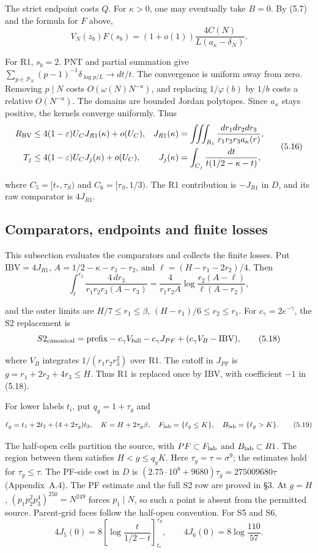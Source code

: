 The strict endpoint costs $Q$.
For $\kappa>0$, one may eventually take $B=0$.
By (5.7) and the formula for $F$ above,
\[
 V_N(z_b)F(s_b)=(1+o(1))\frac{4C(N)}{L(a_\kappa-\delta_N)}.
\tag{5.15}
\]

For R1, $s_b=2$.
PNT and partial summation give
$\sum_{p\in\mathcal P_N}(p-1)^{-1}\delta_{\log p/L}\to dt/t$.
The convergence is uniform away from zero.
Removing $p\mid N$ costs $O(\omega(N)N^{-u})$,
and replacing $1/\varphi(b)$ by $1/b$ costs a relative $O(N^{-u})$.
The domains are bounded Jordan polytopes.
Since $a_\kappa$ stays positive, the kernels converge uniformly.
Thus
\[
 \begin{aligned}
 R_{\rm BV}&\le4(1-\varepsilon)U_C J_{R1}(\kappa)+o(U_C),&
 J_{R1}(\kappa)&=\iiint_{R_1}\frac{dr_1dr_2dr_3}{r_1r_2r_3a_\kappa(r)},\\
 T_j&\le4(1-\varepsilon)U_C J_j(\kappa)+o(U_C),&
 J_j(\kappa)&=\int_{C_j}\frac{dt}{t(1/2-\kappa-t)},
 \end{aligned}
\tag{5.16}
\]

where $C_5=[t_*,\tau_S)$ and $C_6=[\tau_S,1/3)$.
The R1 contribution is $-J_{R1}$ in $D$,
and its raw comparator is $4J_{R1}$.

\subsection{Comparators, endpoints and finite losses}

This subsection evaluates the comparators and collects the finite losses.
Put $\mathrm{IBV}=4J_{R1}$,
$A=1/2-\kappa-r_1-r_2$, and $\ell=(H-r_1-2r_2)/4$.
Then
\[
 \int_\ell^{r_2}\frac{4\,dr_3}{r_1r_2r_3(A-r_3)}
 =\frac4{r_1r_2A}\log\frac{r_2(A-\ell)}{\ell(A-r_2)},
\tag{5.17}
\]

and the outer limits are $H/7\le r_1\le\beta$,
$(H-r_1)/6\le r_2\le r_1$.
For $c_\gamma=2e^{-\gamma}$, the S2 replacement is
\[
 S2_{\rm canonical}
 =\mathrm{prefix}-c_\gamma V_{\rm full}-c_\gamma J_{PF}
       +(c_\gamma V_B-\mathrm{IBV}),
\tag{5.18}
\]

where $V_B$ integrates $1/(r_1r_2r_3^2)$ over R1.
The cutoff in $J_{PF}$ is $g=r_1+2r_2+4r_3\le H$.
Thus R1 is replaced once by $\mathrm{IBV}$,
with coefficient $-1$ in (5.18).

For lower labels $t_i$, put $q_g=1+\tau_g$ and
\[
 \ell_g=t_1+2t_2+(4+2\tau_g)t_3,\quad K=H+2\tau_g\beta,
 \quad F_{\rm lab}=\{\ell_g\le K\},\quad B_{\rm lab}=\{\ell_g>K\}.
\tag{5.19}
\]

The half-open cells partition the source, with
$PF\subset F_{\rm lab}$ and $B_{\rm lab}\subset R1$.
The region between them satisfies $H<g\le q_gK$.
Here $\tau_g=\tau=\sigma^9$; the estimates hold for $\tau_g\le\tau$.
The PF-side cost in $D$ is
$(2.75\cdot10^8+9680)\tau_g=275009680\tau$ (Appendix~A.4).
The PF estimate and the full S2 row are proved in \S{}3.
At $g=H$, $(p_1p_2^2p_3^4)^{250}=N^{249}$ forces $p_1\mid N$,
so such a point is absent from the permitted source.
Parent-grid faces follow the half-open convention.
For S5 and S6,
\[
 4J_5(0)=8\left[\log\frac{t}{1/2-t}\right]_{t_*}^{\tau_S},\qquad
 4J_6(0)=8\log\frac{110}{57}.
\tag{5.20}
\]


